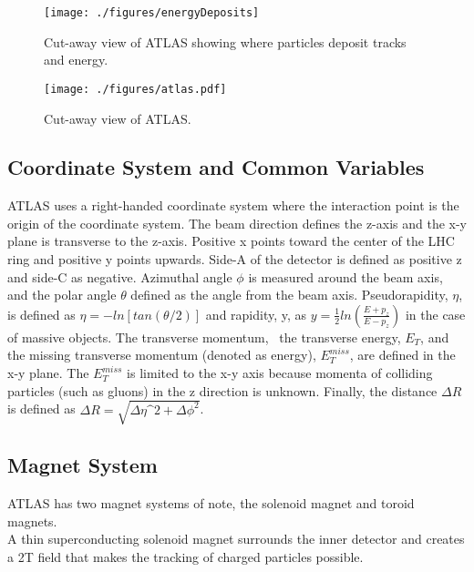 \begin{figure}[h!]
  \centering
	\texttt{[image: ./figures/energyDeposits]}
\caption{\label{fig:energyDeposits}{ Cut-away view of ATLAS showing where particles deposit tracks and energy. }} %
\end{figure}


\begin{figure}[h!]
  \centering
	\texttt{[image: ./figures/atlas.pdf]}
\caption{\label{fig:atlas}{ Cut-away view of ATLAS. }} %
\end{figure}


\subsection{Coordinate System and Common Variables}

ATLAS uses a right-handed coordinate system where the interaction point is the origin of the coordinate system.  The beam direction defines the z-axis and the x-y plane is transverse to the z-axis.  Positive x points toward the center of the LHC ring and positive y points upwards.  Side-A of the detector is defined as positive z and side-C as negative.  Azimuthal angle $\phi$ is measured around the beam axis, and the polar angle $\theta$ defined as the angle from the beam axis.  Pseudorapidity, $\eta$, is defined as $\eta = -ln[tan(\theta/2)]$ and rapidity, y, as $y=\frac{1}{2} ln(\frac{E+p_{z}}{E-p_{z}})$ in the case of massive objects.  The transverse momentum, \pt\,  the transverse energy, $E_{T}$, and the missing transverse momentum (denoted as energy), $E_{T}^{miss}$, are defined in the x-y plane.  The $E_{T}^{miss}$ is limited to the x-y axis because momenta of colliding particles (such as gluons) in the z direction is unknown.  Finally, the distance $\Delta R$ is defined as $\Delta R = \sqrt{\Delta\eta\^{2} + \Delta\phi^{2}}$.\\

\subsection{Magnet System}

ATLAS has two magnet systems of note, the solenoid magnet and toroid magnets.\\

A thin superconducting solenoid magnet surrounds the inner detector and creates a 2T field that makes the tracking of charged particles possible.  \\

